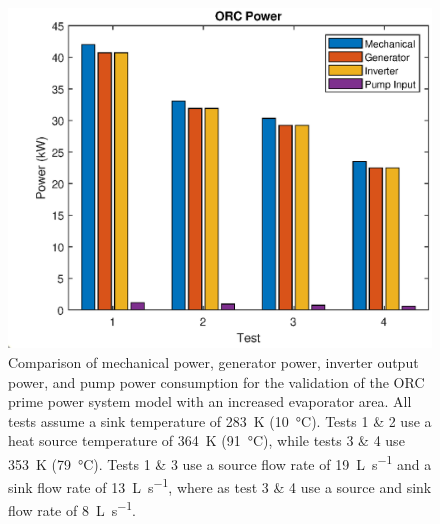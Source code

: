 \begin{figure}[h]
	\centering
	
	\includegraphics[width=\textwidth]{figures/VerificationPower02}
	
	\caption{Comparison of mechanical power, generator power, inverter output power, and pump power consumption for the validation of the ORC prime power system model with an increased evaporator area. All tests assume a sink temperature of \SI{283}{\kelvin} (\SI{10}{\degreeCelsius}). Tests 1 \& 2 use a heat source temperature of \SI{364}{\kelvin} (\SI{91}{\degreeCelsius}), while tests 3 \& 4 use \SI{353}{\kelvin} (\SI{79}{\degreeCelsius}). Tests 1 \& 3 use a source flow rate of \SI{19}{\liter\per\second} and a sink flow rate of \SI{13}{\liter\per\second}, where as test 3 \& 4 use a source and sink flow rate of \SI{8}{\liter\per\second}.
	}
	\label{fig:verificationPower02}
\end{figure}